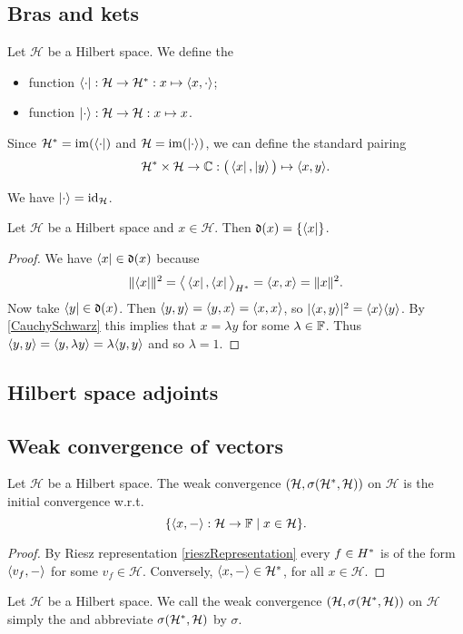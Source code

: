 \subsection{Bras and kets}
\begin{definition}
Let $\mathcal{H}$ be a Hilbert space. We define the
\begin{itemize}
\item {} function $\bra{\cdot}: \mathcal{H}\to \dual{\mathcal{H}}: x\mapsto \inner{x, \cdot}$;
\item {} function $\left| \cdot \right\rangle: \mathcal{H}\to \mathcal{H}: x\mapsto x$.
\end{itemize}
Since ${\mathcal{H}}^* = \operatorname{im}(\left\langle \cdot \right|)$ and $\mathcal{H} = \operatorname{im}(\left| \cdot \right\rangle)$, we can define the standard pairing
\[ \dual{\mathcal{H}}\times\mathcal{H} \to \C: \big(\bra{x}, \ket{y}\big) \mapsto \inner{x,y}. \]
\end{definition}
We have $\left| \cdot \right\rangle = \operatorname{id}_\mathcal{H}$.

\begin{lemma} \label{dualitySetHilbertSpace}
Let $\mathcal{H}$ be a Hilbert space and $x\in \mathcal{H}$. Then $\operatorname{\mathfrak{d}}(x) = \{\left\langle x \right|\}$.
\end{lemma}
\begin{proof}
We have $\left\langle x \right|\in \operatorname{\mathfrak{d}}(x)$ because
\[ \norm{\bra{x}}^2 = \inner[\big]{\bra{x}, \bra{x}}_{\dual{H}} = \inner{x,x} = \norm{x}^2. \]
Now take $\left\langle y \right|\in \operatorname{\mathfrak{d}}(x)$. Then $\inner{y,y} = \inner{y,x} = \inner{x,x}$, so $|\inner{x,y}|^2 = \inner{x} \inner{y}$. By \ref{CauchySchwarz} this implies that $x = \lambda y$ for some $\lambda\in\mathbb{F}$. Thus $\inner{y,y} = \inner{y,\lambda y} = \lambda \inner{y,y}$ and so $\lambda = 1$.
\end{proof}

\subsection{Hilbert space adjoints}

\subsection{Weak convergence of vectors}
\begin{lemma}
Let $\mathcal{H}$ be a Hilbert space. The weak convergence $\sSet{\mathcal{H}, \sigma(\dual{\mathcal{H}}, \mathcal{H})}$ on $\mathcal{H}$ is the initial convergence w.r.t.
\[ \setbuilder{\inner{x,-}: \mathcal{H}\to \F}{x\in\mathcal{H}}. \]
\end{lemma}
\begin{proof}
By Riesz representation \ref{rieszRepresentation} every $f\in {H}^*$ is of the form $\inner{v_f, -}$ for some $v_f\in \mathcal{H}$. Conversely, $\inner{x,-}\in \dual{\mathcal{H}}$, for all $x\in \mathcal{H}$.
\end{proof}
\begin{definition}
Let $\mathcal{H}$ be a Hilbert space. We call the weak convergence $\sSet{\mathcal{H}, \sigma(\dual{\mathcal{H}}, \mathcal{H})}$ on $\mathcal{H}$ simply the  and abbreviate $\sigma({\mathcal{H}}^*, \mathcal{H})$ by $\sigma$.
\end{definition}

